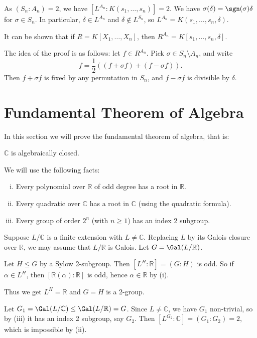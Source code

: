 \documentclass[12pt]{article}
\begin{document}
\begin{proofbox}
	As $(S_n : A_n) = 2$, we have $[L^{A_n} : K(s_1, \ldots, s_n)] = 2$. We have $\sigma(\delta) = \sgn(\sigma) \delta$ for $\sigma \in S_n$. In particular, $\delta \in L^{A_n}$ and $\delta \not \in L^{S_n}$, so $L^{A_n} = K(s_1, \ldots, s_n, \delta)$.
\end{proofbox}

\begin{remark}
	It can be shown that if $R = K[X_1, \dots, X_n]$, then $R^{A_n} = K[s_1, \ldots, s_n, \delta]$.
\end{remark}

The idea of the proof is as follows: let $f \in R^{A_n}$. Pick $\sigma \in S_n \setminus A_n$, and write
\[
f = \frac{1}{2}((f + \sigma f) + (f - \sigma f)).
\]
Then $f + \sigma f$ is fixed by any permutation in $S_n$, and $f - \sigma f$ is divisible by $\delta$.

\newpage

\section{Fundamental Theorem of Algebra}
\label{sec:ftoa}

In this section we will prove the fundamental theorem of algebra, that is:

\begin{theorem}
	$\mathbb{C}$ is algebraically closed.
\end{theorem}

\begin{proofbox}
	We will use the following facts:
	\begin{enumerate}[(i)]
		\item Every polynomial over $\mathbb{R}$ of odd degree has a root in $\mathbb{R}$.
		\item Every quadratic over $\mathbb{C}$ has a root in $\mathbb{C}$ (using the quadratic formula).
		\item Every group of order $2^n$ (with $n \geq 1$) has an index 2 subgroup.
	\end{enumerate}
	Suppose $L/\mathbb{C}$ is a finite extension with $L \neq \mathbb{C}$. Replacing $L$ by its Galois closure over $\mathbb{R}$, we may assume that $L/\mathbb{R}$ is Galois. Let $G = \Gal(L/\mathbb{R})$.

	Let $H \leq G$ by a Sylow 2-subgroup. Then $[L^H : \mathbb{R}] = (G:H)$ is odd. So if $\alpha \in L^H$, then $[\mathbb{R}(\alpha) : \mathbb{R}]$ is odd, hence $\alpha \in \mathbb{R}$ by (i).

	Thus we get $L^H = \mathbb{R}$ and $G = H$ is a 2-group.

	Let $G_1 = \Gal(L/\mathbb{C}) \leq \Gal(L/\mathbb{R}) = G$. Since $L \neq \mathbb{C}$, we have $G_1$ non-trivial, so by (iii) it has an index 2 subgroup, say $G_2$. Then $[L^{G_2} : \mathbb{C}] = (G_1 : G_2) = 2$, which is impossible by (ii).
\end{proofbox}
\end{document}
